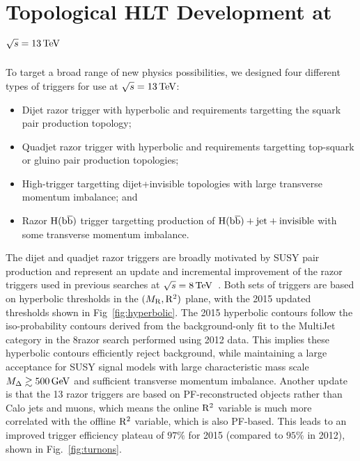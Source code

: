 \chapter{Topological HLT Development at $\sqrt{s}=13 \,\text{Te\hspace{-.08em}V}$}
\label{ch:hlt13TeV}

To target a broad range of new physics possibilities, we designed four different
types of triggers for use at $\sqrt{s}=13\,\text{Te\hspace{-.08em}V}$:
\begin{itemize}
\item Dijet razor trigger with hyperbolic \MR and \Rtwo requirements targetting the squark pair production topology;
\item Quadjet razor trigger with hyperbolic \MR and \Rtwo requirements
  targetting top-squark or gluino pair production topologies;
\item High-\Rtwo trigger targetting dijet+invisible topologies with
  large transverse momentum imbalance; and
\item Razor $\mathrm{H}(\mathrm{b}\overline{\mathrm{b}})$ trigger targetting production of
  $\mathrm{H}(\mathrm{b}\overline{\mathrm{b}})+\mathrm{jet}+\mathrm{invisible}$ with some transverse momentum imbalance.
\end{itemize}

The dijet and quadjet razor triggers are broadly motivated by SUSY pair
production and represent an update and incremental improvement of the razor triggers
used in previous searches at $\sqrt{s}=8\,\text{Te\hspace{-.08em}V}$~\cite{razor8TeV}. Both
sets of triggers are based on hyperbolic thresholds in the $(M_\mathrm{R},\mathrm{R}^2)$
plane, with the 2015 updated thresholds shown in
Fig~\ref{fig:hyperbolic}. The 2015 hyperbolic contours follow the
iso-probability contours derived from the background-only fit to the MultiJet category
in the 8\TeV razor search performed using 2012 data. This implies
these hyperbolic contours efficiently reject background, while
maintaining a large acceptance for SUSY signal models with large
characteristic mass scale $M_{\Delta}\gtrsim 500 \,\text{Ge\hspace{-.08em}V}$ and sufficient
transverse momentum imbalance. Another update is that the 13 \TeV razor triggers are based on PF-reconstructed objects rather
than Calo jets and muons, which means the online $\mathrm{R}^2$ variable is
much more correlated with the offline $\mathrm{R}^2$ variable, which is also
PF-based. This leads to an improved trigger efficiency plateau of
$97\%$ for 2015 (compared to $95\%$ in 2012), shown in Fig.~\ref{fig:turnons}.

